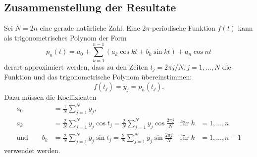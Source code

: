 \subsection{Zusammenstellung der Resultate}
Sei $N=2n$ eine gerade natürliche Zahl.
Eine $2\pi$-periodische Funktion $f(t)$ kann als trigonometrisches Polynom
der Form
\[
p_n(t)
=
a_0 + \sum_{k=1}^{n-1} (a_k\cos kt + b_k\sin kt) + a_n\cos nt
\]
derart approximiert werden, dass zu den Zeiten $t_j=2\pi j/N, j=1,\dots,N$ 
die Funktion und das trigonometrische Polynom übereinstimmen:
\[
f(t_j) = y_j = p_n(t_j).
\]
Dazu müssen die Koeffizienten
\begin{align*}
a_0
&=
\frac{1}N
\sum_{j=1}^N y_j,
\\
a_k
&=
\frac{2}N
\sum_{j=1}^N y_j\cos t_j
=
\frac{2}N
\sum_{j=1}^N y_j\cos \frac{2\pi j}{N}&\text{für }k&=1,\dots,n
\\
\text{und}\qquad
b_k
&=
\frac{2}N
\sum_{j=1}^N y_j\sin t_j
=
\frac{2}N
\sum_{j=1}^N y_j\sin \frac{2\pi j}{N}&\text{für }k&=1,\dots,n-1
\end{align*}
verwendet werden.

